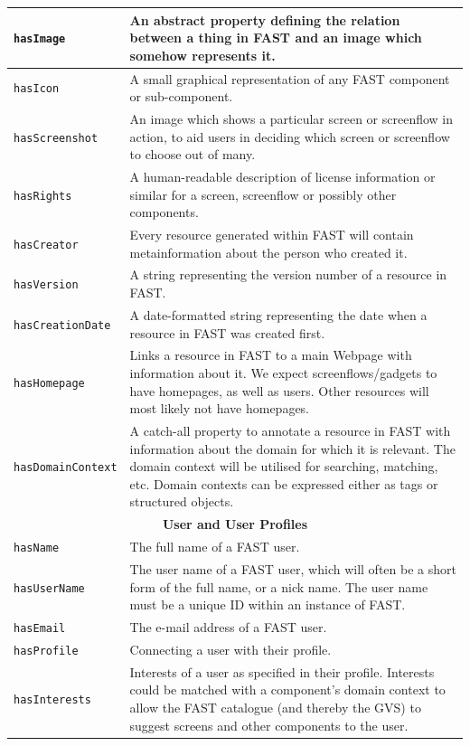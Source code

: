 \documentclass[twoside]{fast_latex}
\begin{document}
\begin{small}
\begin{longtable}{|p{3.25cm}|p{11cm}|}
\texttt{hasImage} & An abstract property defining the relation between a thing in FAST and an image which somehow represents it. \\ \hline
\texttt{hasIcon} & A small graphical representation of any FAST component or sub-component. \\ \hline
\texttt{hasScreenshot} & An image which shows a particular screen or screenflow in action, to aid users in deciding which screen or screenflow to choose out of many. \\ \hline
\texttt{hasRights} & A human-readable description of license information or similar for a screen, screenflow or possibly other components. \\ \hline
\texttt{hasCreator} & Every resource generated within FAST will contain metainformation about the person who created it. \\ \hline
\texttt{hasVersion} & A string representing the version number of a resource in FAST. \\ \hline
\texttt{hasCreationDate} & A date-formatted string representing the date when a resource in FAST was created first. \\ \hline
\texttt{hasHomepage} & Links a resource in FAST to a main Webpage with information about it. We expect screenflows/gadgets to have homepages, as well as users. Other resources will most likely not have homepages. \\ \hline
\texttt{hasDomainContext} & A catch-all property to annotate a resource in FAST with information about the domain for which it is relevant. The domain context will be utilised for searching, matching, etc. Domain contexts can be expressed either as tags or structured objects. \\ \hline
\multicolumn{2}{|c|}{\textbf{User and User Profiles}} \\ \hline
\texttt{hasName} & The full name of a FAST user. \\ \hline
\texttt{hasUserName} & The user name of a FAST user, which will often be a short form of the full name, or a nick name. The user name must be a unique ID within an instance of FAST. \\ \hline
\texttt{hasEmail} & The e-mail address of a FAST user. \\ \hline
\texttt{hasProfile} & Connecting a user with their profile. \\ \hline
\texttt{hasInterests} & Interests of a user as specified in their profile. Interests could be matched with a component's domain context to allow the FAST catalogue (and thereby the GVS) to suggest screens and other components to the user. \\ \hline
\end{longtable}
\end{small}
\doublespacing
\end{document}

